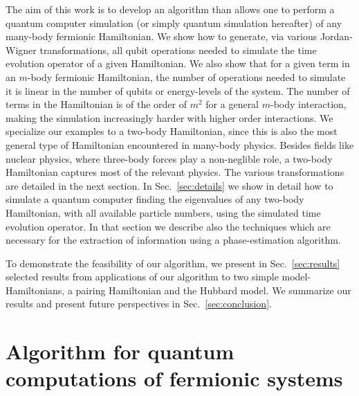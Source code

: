 \documentclass[aps,pra,twocolumn,floatfix]{revtex4}
\begin{document}
The aim of this work is to develop an algorithm than allows one to perform   
a quantum computer simulation (or simply quantum simulation hereafter) of  any many-body
fermionic Hamiltonian. We show how to generate, via various Jordan-Wigner
transformations, all qubit operations
needed to simulate the time evolution operator of a given  Hamiltonian.
We also show that for a given term in an $m$-body fermionic
Hamiltonian, the number of operations needed to simulate it is linear
in the number of qubits or energy-levels of the system. The number of
terms in the Hamiltonian is of the order of $m^2$ for a
general $m$-body interaction, making the simulation increasingly
harder with higher order interactions. We specialize our examples to a two-body Hamiltonian,
since this is also the most general  type of Hamiltonian encountered in many-body physics.
Besides fields like nuclear physics, where three-body forces play a non-neglible role,
a two-body Hamiltonian captures most of the relevant physics. The various transformations are
detailed in the next section. In Sec.~\ref{sec:details} 
we show in detail how to simulate a quantum computer finding the
eigenvalues of any two-body Hamiltonian, with all available particle
numbers, 
using the simulated time
evolution operator. In that section we describe also the techniques which are necessary for the
extraction of information using a phase-estimation algorithm. 

To demonstrate the feasibility of our algorithm, 
we present in Sec.~\ref{sec:results} selected results from applications of 
our algorithm to two simple model-Hamiltonians, a pairing Hamiltonian and the Hubbard model.
We summarize our results and present future perspectives in  
Sec.~\ref{sec:conclusion}.


\section{Algorithm for quantum computations of fermionic systems}
\label{sec:algo}
\end{document}
